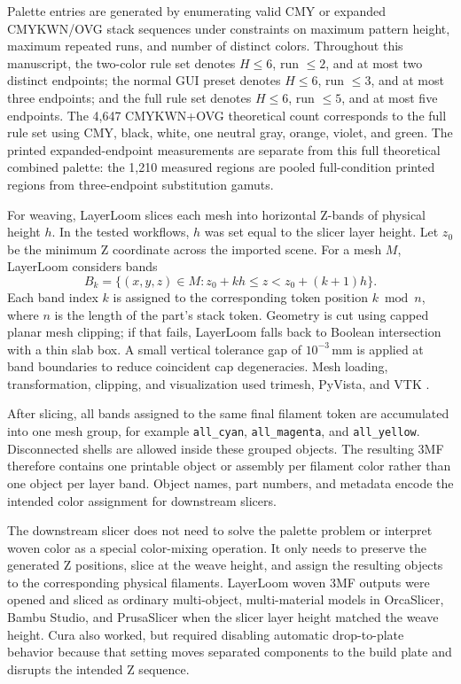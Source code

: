 \documentclass[5p,times,numbers]{elsarticle}
\begin{document}
Palette entries are generated by enumerating valid CMY or expanded CMYKWN/OVG stack sequences under constraints on maximum pattern height, maximum repeated runs, and number of distinct colors. Throughout this manuscript, the two-color rule set denotes \(H \leq 6\), run \(\leq 2\), and at most two distinct endpoints; the normal GUI preset denotes \(H \leq 6\), run \(\leq 3\), and at most three endpoints; and the full rule set denotes \(H \leq 6\), run \(\leq 5\), and at most five endpoints. The 4,647 CMYKWN+OVG theoretical count corresponds to the full rule set using CMY, black, white, one neutral gray, orange, violet, and green. The printed expanded-endpoint measurements are separate from this full theoretical combined palette: the 1,210 measured regions are pooled full-condition printed regions from three-endpoint substitution gamuts.

For weaving, LayerLoom slices each mesh into horizontal Z-bands of physical height \(h\). In the tested workflows, \(h\) was set equal to the slicer layer height. Let \(z_0\) be the minimum Z coordinate across the imported scene. For a mesh \(M\), LayerLoom considers bands
\[
B_k = \{(x,y,z) \in M : z_0 + kh \leq z < z_0 + (k+1)h\}.
\]
Each band index \(k\) is assigned to the corresponding token position \(k \bmod n\), where \(n\) is the length of the part's stack token. Geometry is cut using capped planar mesh clipping; if that fails, LayerLoom falls back to Boolean intersection with a thin slab box. A small vertical tolerance gap of \(10^{-3}\,\mathrm{mm}\) is applied at band boundaries to reduce coincident cap degeneracies. Mesh loading, transformation, clipping, and visualization used trimesh, PyVista, and VTK \citep{trimesh,sullivan2019pyvista,schroeder2006vtk}.

After slicing, all bands assigned to the same final filament token are accumulated into one mesh group, for example \texttt{all\_cyan}, \texttt{all\_magenta}, and \texttt{all\_yellow}. Disconnected shells are allowed inside these grouped objects. The resulting 3MF therefore contains one printable object or assembly per filament color rather than one object per layer band. Object names, part numbers, and metadata encode the intended color assignment for downstream slicers.

The downstream slicer does not need to solve the palette problem or interpret woven color as a special color-mixing operation. It only needs to preserve the generated Z positions, slice at the weave height, and assign the resulting objects to the corresponding physical filaments. LayerLoom woven 3MF outputs were opened and sliced as ordinary multi-object, multi-material models in OrcaSlicer, Bambu Studio, and PrusaSlicer when the slicer layer height matched the weave height. Cura also worked, but required disabling automatic drop-to-plate behavior because that setting moves separated components to the build plate and disrupts the intended Z sequence.
\end{document}
